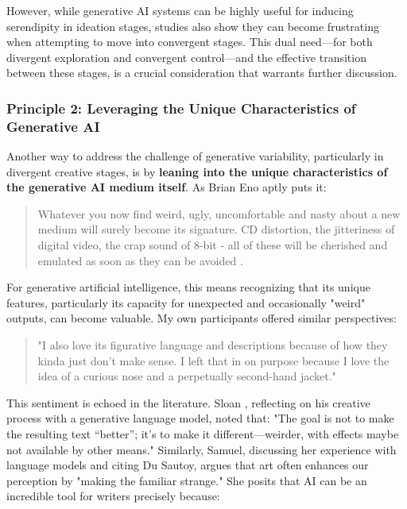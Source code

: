 However, while generative AI systems can be highly useful for inducing serendipity in ideation stages, studies also show they can become frustrating when attempting to move into convergent stages. This dual need—for both divergent exploration and convergent control—and the effective transition between these stages, is a crucial consideration that warrants further discussion.

\subsubsection{Principle 2: Leveraging the Unique Characteristics of Generative AI}

Another way to address the challenge of generative variability, particularly in divergent creative stages, is by \textbf{leaning into the unique characteristics of the generative AI medium itself}. As Brian Eno aptly puts it:

\begin{quote}
    Whatever you now find weird, ugly, uncomfortable and nasty about a new medium will surely become its signature. CD distortion, the jitteriness of digital video, the crap sound of 8-bit - all of these will be cherished and emulated as soon as they can be avoided \cite{Eno2007-fl}.
\end{quote}

For generative artificial intelligence, this means recognizing that its unique features, particularly its capacity for unexpected and occasionally "weird" outputs, can become valuable. My own participants offered similar perspectives:

\begin{quote}
"I also love its figurative language and descriptions because of how they kinda just don't make sense. I left that in on purpose because I love the idea of a curious nose and a perpetually second-hand jacket."
\end{quote}

This sentiment is echoed in the literature. Sloan \cite{Sloan2016-fj}, reflecting on his creative process with a generative language model, noted that: "The goal is not to make the resulting text “better”; it’s to make it different—weirder, with effects maybe not available by other means." Similarly, Samuel, discussing her experience with language models and citing Du Sautoy, argues that art often enhances our perception by "making the familiar strange." She posits that AI can be an incredible tool for writers precisely because:

